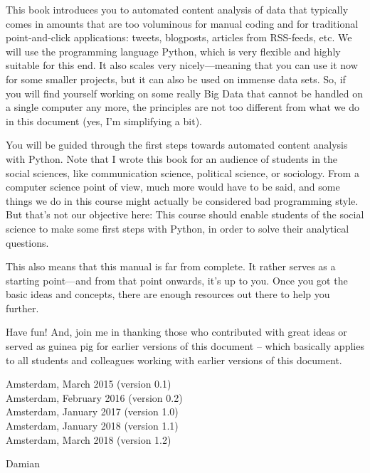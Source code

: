 \documentclass[a4paper,12pt]{book}
\begin{document}
This book introduces you to automated content analysis of data that typically comes in amounts that are too voluminous for manual coding and for traditional point-and-click applications: tweets, blogposts, articles from RSS-feeds, etc. We will use the programming language Python, which is very flexible and highly suitable for this end. It also scales very nicely---meaning that you can use it now for some smaller projects, but it can also be used on immense data sets. So, if you will find yourself working on some really Big Data that cannot be handled on a single computer any more, the principles are not too different from what we do in this document (yes, I'm simplifying a bit).

You will be guided through the first steps towards automated content analysis with Python. Note that I wrote this book for an audience of students in the social sciences, like communication science, political science, or sociology. From a computer science point of view, much more would have to be said, and some things we do in this course might actually be considered bad programming style. But that's not our objective here: This course should enable students of the social science to make some first steps with Python, in order to solve their analytical questions.

This also means that this manual is far from complete. It rather serves as a starting point---and from that point onwards, it's up to you. Once you got the basic ideas and concepts, there are enough resources out there to help you further.

Have fun! And, join me in thanking those who contributed with great ideas or served as guinea pig for earlier versions of this document -- which basically applies to all students and colleagues working with earlier versions of this document. 

\vspace{.5cm}

\begin{flushright}
Amsterdam, March 2015 (version 0.1)\\
Amsterdam, February 2016 (version 0.2)\\
Amsterdam, January 2017 (version 1.0)\\
Amsterdam, January 2018 (version 1.1)\\
Amsterdam, March 2018 (version 1.2)
\end{flushright}

Damian
\end{document}
